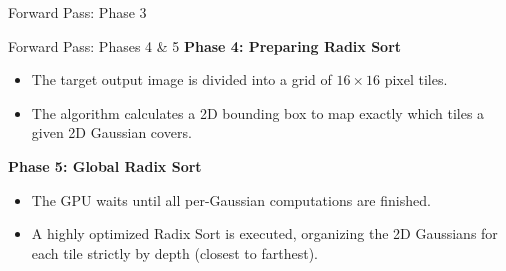 \begin{frame}{Forward Pass: Phase 3}
{\begin{figure}
        \end{figure}
    }
\end{frame}

\begin{frame}{Forward Pass: Phases 4 \& 5}
    \textbf{Phase 4: Preparing Radix Sort}
    \begin{itemize}
        \justifying
        \item The target output image is divided into a grid of $16\times16$ pixel tiles.
        \item The algorithm calculates a 2D bounding box to map exactly which tiles a given 2D Gaussian covers.
    \end{itemize}
    
    \vspace{1em}
    
    \pause
    \textbf{Phase 5: Global Radix Sort}
    \begin{itemize}
        \justifying
        \item The GPU waits until all per-Gaussian computations are finished.
        \item A highly optimized Radix Sort is executed, organizing the 2D Gaussians for each tile strictly by depth (closest to farthest).
    \end{itemize}
\end{frame}

